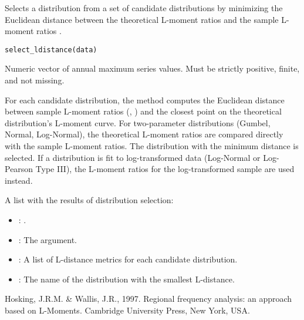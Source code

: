 \documentclass[a4paper]{book}
\begin{document}
%
\begin{Description}
Selects a distribution from a set of candidate distributions by minimizing the
Euclidean distance between the theoretical L-moment ratios 
and the sample L-moment ratios .
\end{Description}
%
\begin{Usage}
\begin{verbatim}
select_ldistance(data)
\end{verbatim}
\end{Usage}
%
\begin{Arguments}
\begin{ldescription}
\item[\code{data}] Numeric vector of annual maximum series values.
Must be strictly positive, finite, and not missing.
\end{ldescription}
\end{Arguments}
%
\begin{Details}
For each candidate distribution, the method computes the Euclidean distance between
sample L-moment ratios (, ) and the closest point on the
theoretical distribution's L-moment curve. For two-parameter distributions (Gumbel,
Normal, Log-Normal), the theoretical L-moment ratios are compared directly with
the sample L-moment ratios. The distribution with the minimum distance is selected.
If a distribution is fit to log-transformed data (Log-Normal or Log-Pearson Type
III), the L-moment ratios for the log-transformed sample are used instead.
\end{Details}
%
\begin{Value}
A list with the results of distribution selection:
\begin{itemize}

\item{} : .
\item{} : The  argument.
\item{} : A list of L-distance metrics for each candidate distribution.
\item{} : The name of the distribution with the smallest L-distance.

\end{itemize}

\end{Value}
%
\begin{References}
Hosking, J.R.M. \& Wallis, J.R., 1997. Regional frequency analysis: an approach based
on L-Moments. Cambridge University Press, New York, USA.
\end{References}
\end{document}
